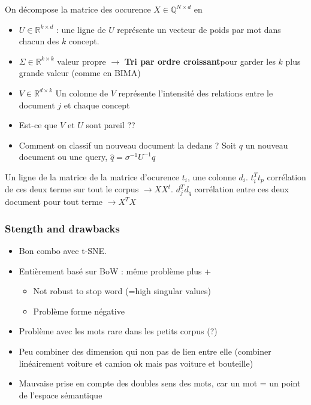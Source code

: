 \documentclass{article}
\begin{document}
\begin{multicols}{2}
    On décompose la matrice des occurence $ X \in \mathbb{Q}^{N \times d}$ en \begin{itemize}
        \item $ U \in \mathbb{R}^{k \times d} $ : une ligne de $ U $ représente un vecteur de poids par mot dans chacun des $ k $ concept.
        \item $ \Sigma \in \mathbb{R}^{k \times k} $ valeur propre $\rightarrow$ \textbf{Tri par ordre croissant}pour garder les $k$ plus grande valeur (comme en BIMA)
        \item $ V \in \mathbb{R}^{d \times k} $ Un colonne de $ V $ représente l'intensité des relations entre le document $j$ et chaque concept
        \item Est-ce que $ V $ et $ U $ sont pareil ?? 
        \item Comment on classif un nouveau document la dedans ? Soit $ q $ un nouveau document ou une query, $ \hat{q} = \sigma ^{-1} U^{-1} q $ 
    \end{itemize}
    Un ligne de la matrice de la matrice d'ocurence $ t_i $, une colonne $ d_i $. $ t_i^T t_p $ corrélation de ces deux terme sur tout le corpus $\rightarrow X X^t$. $ d_j^T d_q $ corrélation entre ces deux document pour tout terme $\rightarrow X^T X$
    
    \subsubsection{Stength and drawbacks}
    \begin{itemize}
        \item Bon combo avec t-SNE.
        \item Entièrement basé sur BoW : même problème  plus +\begin{itemize}
            \item Not robust to stop word (=high singular values)
            \item Problème forme négative 
        \end{itemize}
        \item Problème avec les mots rare dans les petits corpus (?)
        \item Peu combiner des dimension qui non pas de lien entre elle (combiner linéairement voiture et camion ok mais pas voiture et bouteille)
        \item Mauvaise prise en compte des doubles sens des mots, car un mot = un point de l'espace sémantique
    \end{itemize}
    

\end{multicols}
\end{document}

